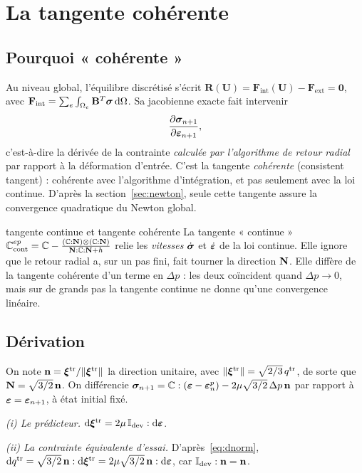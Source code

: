 \section{La tangente cohérente}\label{sec:tangente}

\subsection{Pourquoi « cohérente »}

Au niveau global, l'équilibre discrétisé s'écrit $\mathbf{R}(\mathbf{U}) = \mathbf{F}_{\mathrm{int}}(\mathbf{U})-\mathbf{F}_{\mathrm{ext}}=\mathbf{0}$, avec $\mathbf{F}_{\mathrm{int}} = \sum_e\int_{\Omega_e}\mathbf{B}^T\boldsymbol{\sigma}\,\mathrm{d}\Omega$. Sa jacobienne exacte fait intervenir
\[
\frac{\partial\boldsymbol{\sigma}_{n+1}}{\partial\boldsymbol{\varepsilon}_{n+1}},
\]
c'est-à-dire la dérivée de la contrainte \emph{calculée par l'algorithme de retour radial} par rapport à la déformation d'entrée. C'est la tangente \emph{cohérente} (consistent tangent) : cohérente avec l'algorithme d'intégration, et pas seulement avec la loi continue. D'après la section~\ref{sec:newton}, seule cette tangente assure la convergence quadratique du Newton global.

\begin{rappel}{tangente continue et tangente cohérente}
La tangente « continue » $\mathbb{C}^{ep}_{\mathrm{cont}}=\mathbb{C}-\frac{(\mathbb{C}:\mathbf{N})\otimes(\mathbb{C}:\mathbf{N})}{\mathbf{N}:\mathbb{C}:\mathbf{N}+h}$ relie les \emph{vitesses} $\dot{\boldsymbol{\sigma}}$ et $\dot{\boldsymbol{\varepsilon}}$ de la loi continue. Elle ignore que le retour radial a, sur un pas fini, fait tourner la direction $\mathbf{N}$. Elle diffère de la tangente cohérente d'un terme en $\Delta p$ : les deux coïncident quand $\Delta p\to0$, mais sur de grands pas la tangente continue ne donne qu'une convergence linéaire.
\end{rappel}

\subsection{Dérivation}

On note $\mathbf{n}=\boldsymbol{\xi}^{\mathrm{tr}}/\|\boldsymbol{\xi}^{\mathrm{tr}}\|$ la direction unitaire, avec $\|\boldsymbol{\xi}^{\mathrm{tr}}\|=\sqrt{2/3}\,q^{\mathrm{tr}}$, de sorte que $\mathbf{N}=\sqrt{3/2}\,\mathbf{n}$. On différencie $\boldsymbol{\sigma}_{n+1}=\mathbb{C}:(\boldsymbol{\varepsilon}-\boldsymbol{\varepsilon}^{p}_n)-2\mu\sqrt{3/2}\,\Delta p\,\mathbf{n}$ par rapport à $\boldsymbol{\varepsilon}=\boldsymbol{\varepsilon}_{n+1}$, à état initial fixé.

\emph{(i) Le prédicteur.} $\mathrm{d}\boldsymbol{\xi}^{\mathrm{tr}} = 2\mu\,\mathbb{I}_{\mathrm{dev}}:\mathrm{d}\boldsymbol{\varepsilon}$.

\emph{(ii) La contrainte équivalente d'essai.} D'après~\eqref{eq:dnorm}, $\mathrm{d} q^{\mathrm{tr}} = \sqrt{3/2}\,\mathbf{n}:\mathrm{d}\boldsymbol{\xi}^{\mathrm{tr}} = 2\mu\sqrt{3/2}\,\mathbf{n}:\mathrm{d}\boldsymbol{\varepsilon}$, car $\mathbb{I}_{\mathrm{dev}}:\mathbf{n}=\mathbf{n}$.

